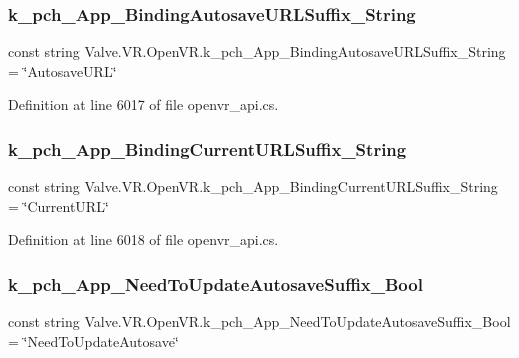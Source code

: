\subsubsection{\texorpdfstring{k\_pch\_App\_BindingAutosaveURLSuffix\_String}{k\_pch\_App\_BindingAutosaveURLSuffix\_String}}
{\footnotesize\ttfamily const string Valve.\+V\+R.\+Open\+V\+R.\+k\+\_\+pch\+\_\+\+App\+\_\+\+Binding\+Autosave\+U\+R\+L\+Suffix\+\_\+\+String = \char`\"{}Autosave\+U\+RL\char`\"{}}



Definition at line 6017 of file openvr\+\_\+api.\+cs.

\mbox{\label{class_valve_1_1_v_r_1_1_open_v_r_a6a7933ae57cb06ab53e1b1b3b4877ed3}} 
\subsubsection{\texorpdfstring{k\_pch\_App\_BindingCurrentURLSuffix\_String}{k\_pch\_App\_BindingCurrentURLSuffix\_String}}
{\footnotesize\ttfamily const string Valve.\+V\+R.\+Open\+V\+R.\+k\+\_\+pch\+\_\+\+App\+\_\+\+Binding\+Current\+U\+R\+L\+Suffix\+\_\+\+String = \char`\"{}Current\+U\+RL\char`\"{}}



Definition at line 6018 of file openvr\+\_\+api.\+cs.

\mbox{\label{class_valve_1_1_v_r_1_1_open_v_r_aa1f15bd6f7ae74394497dd5f7055bb6d}} 
\subsubsection{\texorpdfstring{k\_pch\_App\_NeedToUpdateAutosaveSuffix\_Bool}{k\_pch\_App\_NeedToUpdateAutosaveSuffix\_Bool}}
{\footnotesize\ttfamily const string Valve.\+V\+R.\+Open\+V\+R.\+k\+\_\+pch\+\_\+\+App\+\_\+\+Need\+To\+Update\+Autosave\+Suffix\+\_\+\+Bool = \char`\"{}Need\+To\+Update\+Autosave\char`\"{}}




